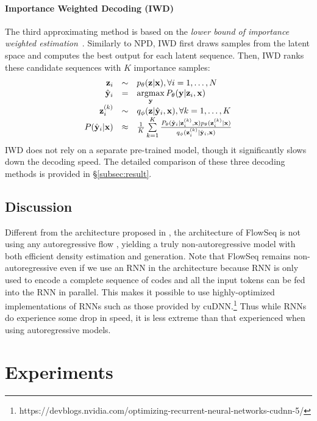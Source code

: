 \documentclass[11pt,a4paper]{article}
\newcommand{\xv}{\mathbf{x}}
\newcommand{\yv}{\mathbf{y}}
\newcommand{\zv}{\mathbf{z}}
\newcommand{\argmax}{\operatornamewithlimits{argmax}}
\begin{document}
\paragraph{Importance Weighted Decoding (IWD)}
The third approximating method is based on the \emph{lower bound of importance weighted estimation}~\citep{burda2015importance}.
Similarly to NPD, IWD first draws samples from the latent space and computes the best output for each latent sequence.
Then, IWD ranks these candidate sequences with $K$ importance samples:
\begin{displaymath}
\begin{array}{rcl}
\zv_i & \sim &  p_{\theta}(\zv|\xv), \forall i = 1, \ldots, N \\
\hat{\yv}_i & = &  \argmax\limits_{\yv} P_{\theta} (\yv | \zv_i, \xv) \\
\zv_{i}^{(k)} & \sim & q_{\phi}(\zv | \hat{\yv}_i, \xv), \forall k = 1, \ldots, K \\
P(\hat{\yv}_i | \xv) & \approx & \frac{1}{K} \sum\limits_{k=1}^{K} \frac{P_{\theta}(\hat{\yv}_i |\zv_{i}^{(k)},  \xv) p_{\theta}(\zv_{i}^{(k)}|\xv)}{q_{\phi}(\zv_{i}^{(k)} | \hat{\yv}_i, \xv)}
\end{array}
\end{displaymath}
IWD does not rely on a separate pre-trained model, though it significantly slows down the decoding speed.
The detailed comparison of these three decoding methods is provided in \S\ref{subsec:result}.

\subsection{Discussion}
Different from the architecture proposed in \citet{ziegler2019latent}, the architecture of FlowSeq is not using any autoregressive flow \citep{kingma1606improving,papamakarios2017masked}, yielding a truly non-autoregressive model with both efficient density estimation and generation.
Note that FlowSeq remains non-autoregressive even if we use an RNN in the architecture because RNN is only used to encode a complete sequence of codes and all the input tokens can be fed into the RNN in parallel.
This makes it possible to use highly-optimized implementations of RNNs such as those provided by cuDNN.\footnote{https://devblogs.nvidia.com/optimizing-recurrent-neural-networks-cudnn-5/}
Thus while RNNs do experience some drop in speed, it is less extreme than that experienced when using autoregressive models. 

\section{Experiments}
\end{document}
